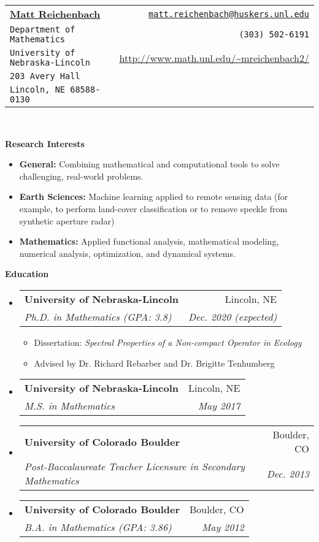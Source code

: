 \documentclass[letterpaper,11pt]{article}
\makeatletter
\newcommand{\resitem}[1]{\item #1 \vspace{-2pt}}
\newcommand{\resheading}[1]{{\large \colorbox{mygrey}{\begin{minipage}{\textwidth}{\textbf{#1 \vphantom{p\^{E}}}}\end{minipage}}}}
\newcommand{\ressubheading}[4]{
\begin{tabular*}{6.5in}{l@{\extracolsep{\fill}}r}
		\textbf{#1} & #2 \\
		\textit{#3} & \textit{#4} \\
\end{tabular*}\vspace{-6pt}}
\makeatother
\begin{document}
\thispagestyle{empty}
\newcommand{\mywebheader}{
\begin{tabular*}{7in}{l@{\extracolsep{\fill}}r}
	\textbf{\href{}{\LARGE Matt Reichenbach}} &\href{mailto:matt.reichenbach@huskers.unl.edu}{\texttt{matt.reichenbach@huskers.unl.edu}}\\
    {\footnotesize \texttt{Department of Mathematics}} & \texttt{(303) 502-6191}\\
	{\footnotesize \texttt{University of Nebraska-Lincoln}} & \url{http://www.math.unl.edu/~mreichenbach2/}\\
	{\footnotesize \texttt{203 Avery Hall}}\\
	{\footnotesize \texttt{Lincoln, NE 68588-0130}}  \\
	\end{tabular*}
\\
\vspace{0.1in}}

\mywebheader

\resheading{Research Interests}
\begin{itemize}
	\resitem{\textbf{General:} Combining mathematical and computational tools to solve challenging, real-world problems.}
	
	\resitem{\textbf{Earth Sciences:} Machine learning applied to remote sensing data (for example, to perform land-cover classification or to remove speckle from synthetic aperture radar)}
	
	\resitem{\textbf{Mathematics:} Applied functional analysis, mathematical modeling, numerical analysis, optimization, and dynamical systems.}
	
	
\end{itemize}

\resheading{Education}
	\begin{itemize}
		\item
			\ressubheading{University of Nebraska-Lincoln}{Lincoln, NE}{Ph.D. in Mathematics (GPA: 3.8)}{Dec. 2020 (expected)}
				{ \footnotesize
				\begin{itemize}
					\resitem{Dissertation: \emph{Spectral Properties of a Non-compact Operator in Ecology}}
					\resitem{Advised by Dr. Richard Rebarber and Dr. Brigitte Tenhumberg}
				\end{itemize}}
		\item
		    	\ressubheading{University of Nebraska-Lincoln}{Lincoln, NE}{M.S. in Mathematics}{May 2017}
		\item
			\ressubheading{University of Colorado Boulder}{Boulder, CO}{Post-Baccalaureate Teacher Licensure in Secondary Mathematics}{Dec. 2013}
		\item
			\ressubheading{University of Colorado Boulder}{Boulder, CO}{B.A. in Mathematics (GPA: 3.86)}{May 2012}
			
	\end{itemize}
\end{document}
